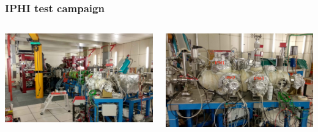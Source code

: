 \begin{frame}
  \frametitle{IPHI test campaign}
  \begin{columns}[T]
    \begin{column}{0.45\textwidth}
      \includegraphics[width=1\textwidth]{04_Test/fig/fig000_IPHI_tb1.jpg}
    \end{column}
    \begin{column}{0.45\textwidth}
      \includegraphics[width=1\textwidth]{04_Test/fig/fig000_IPHI_tb2.jpg}
    \end{column}
  \end{columns}
\end{frame}

